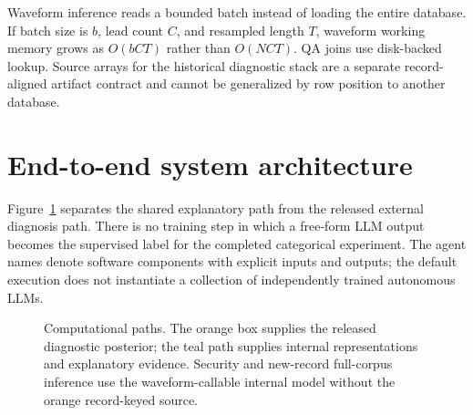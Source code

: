 \documentclass[11pt,a4paper]{article}
\begin{document}
Waveform inference reads a bounded batch instead of loading the entire database. If batch size is $b$, lead count $C$, and resampled length $T$, waveform working memory grows as $O(bCT)$ rather than $O(NCT)$. QA joins use disk-backed lookup. Source arrays for the historical diagnostic stack are a separate record-aligned artifact contract and cannot be generalized by row position to another database.

\section{End-to-end system architecture}
\label{sec:architecture}
Figure~\ref{fig:architecture} separates the shared explanatory path from the released external diagnosis path. There is no training step in which a free-form LLM output becomes the supervised label for the completed categorical experiment. The agent names denote software components with explicit inputs and outputs; the default execution does not instantiate a collection of independently trained autonomous LLMs.

\begin{figure}[htbp]\centering
{}
\caption{Computational paths. The orange box supplies the released diagnostic posterior; the teal path supplies internal representations and explanatory evidence. Security and new-record full-corpus inference use the waveform-callable internal model without the orange record-keyed source.}
\label{fig:architecture}\end{figure}
\end{document}
